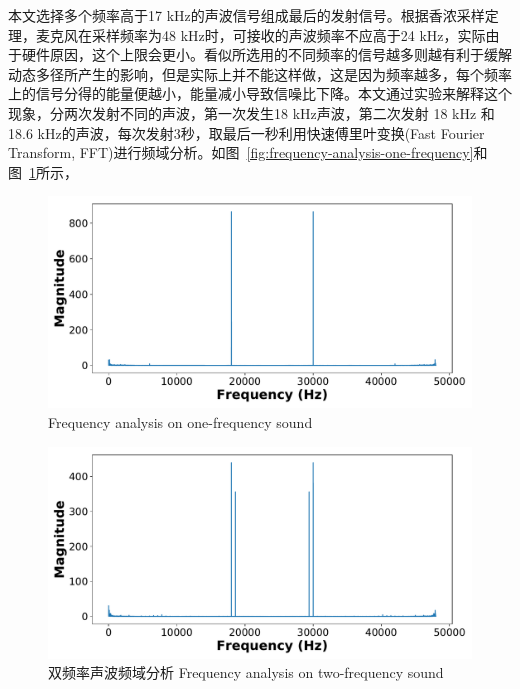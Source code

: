本文选择多个频率高于17 kHz的声波信号组成最后的发射信号。根据香浓采样定理，麦克风在采样频率为48 kHz时，可接收的声波频率不应高于24 kHz，实际由于硬件原因，这个上限会更小。看似所选用的不同频率的信号越多则越有利于缓解动态多径所产生的影响，但是实际上并不能这样做，这是因为频率越多，每个频率上的信号分得的能量便越小，能量减小导致信噪比下降。本文通过实验来解释这个现象，分两次发射不同的声波，第一次发生18 kHz声波，第二次发射 18 kHz 和 18.6 kHz的声波，每次发射3秒，取最后一秒利用快速傅里叶变换(Fast Fourier Transform, FFT)进行频域分析。如图~\ref{fig:frequency-analysis-one-frequency}和图~\ref{fig:frequency-analysis-two-frequency}所示，
\begin{figure}
  \centering
  \begin{minipage}[t]{0.49\textwidth}
    \centering
    \includegraphics[width=\textwidth]{figure/one-freq-fft.pdf}
      {Frequency analysis on one-frequency sound}
        \label{fig:frequency-analysis-one-frequency}
  \end{minipage}
  \centering
  \begin{minipage}[t]{0.49\textwidth}
    \centering
    \includegraphics[width=\textwidth]{figure/two-freq-fft.pdf}
    \bicaption
    {双频率声波频域分析}
    {Frequency analysis on two-frequency sound}
    \label{fig:frequency-analysis-two-frequency}
   \end{minipage}
\end{figure}
